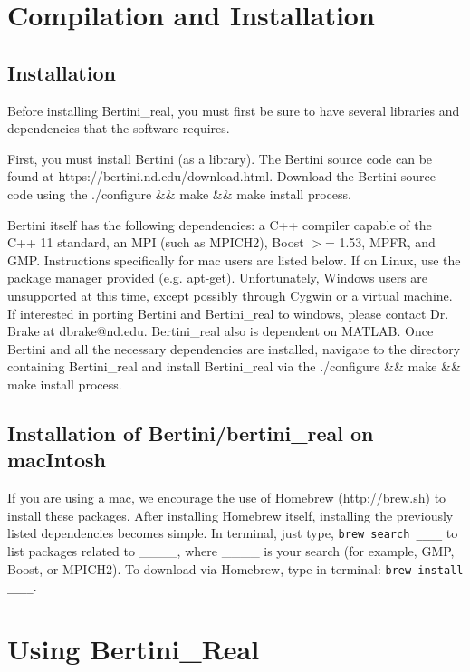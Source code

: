 \documentclass[10pt]{article}
\begin{document}
\section{Compilation and Installation}
\subsection{Installation}
Before installing Bertini\_real, you must first be sure to have several libraries and dependencies that the software requires. \par
First, you must install Bertini (as a library).  The Bertini source code can be found \newline at https://bertini.nd.edu/download.html. Download the Bertini source code using the ./configure \&\& make \&\& make install process. \par
Bertini itself has the following dependencies: a C++ compiler capable of the C++ 11 standard, an MPI (such as MPICH2), Boost $>$= 1.53, MPFR, and GMP. Instructions specifically for mac users are listed below. If on Linux, use the package manager provided (e.g. apt-get). Unfortunately, Windows users are unsupported at this time, except possibly through Cygwin or a virtual machine. If interested in porting Bertini and Bertini\_real to windows, please contact Dr. Brake at dbrake@nd.edu. Bertini\_real also is dependent on MATLAB. Once Bertini and all the necessary dependencies are installed, navigate to the directory containing Bertini\_real and install Bertini\_real via the ./configure \&\& make \&\& make install process. \par
\subsection{Installation of Bertini/bertini\_real on macIntosh}

\indent If you are using a mac, we encourage the use of Homebrew (http://brew.sh) to install these packages. After installing Homebrew itself, installing the previously listed dependencies becomes simple. In terminal, just type, \texttt{brew search \_\_\_\_} to list packages related to \_\_\_\_, where \_\_\_\_ is your search (for example, GMP, Boost, or MPICH2). To download via Homebrew, type in terminal: \texttt{brew install \_\_\_\_}.


\clearpage
\section{Using Bertini\_Real}
\label{sec:running}
\end{document}

